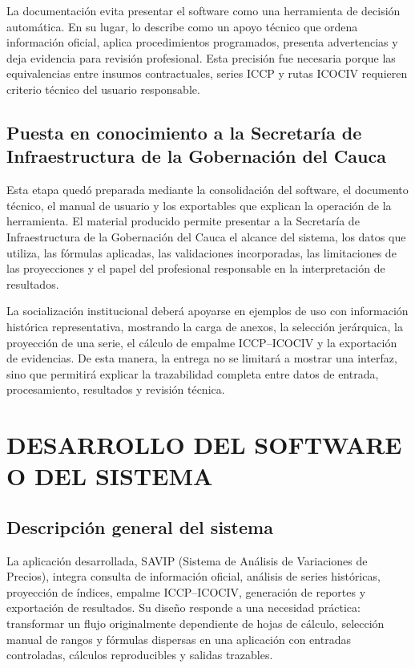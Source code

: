 \documentclass[12pt,letterpaper]{article}
\newcommand{\ICOCIV}{ICOCIV}
\newcommand{\ICCP}{ICCP}
\begin{document}
La documentación evita presentar el software como una herramienta de decisión automática. En su lugar, lo describe como un apoyo técnico que ordena información oficial, aplica procedimientos programados, presenta advertencias y deja evidencia para revisión profesional. Esta precisión fue necesaria porque las equivalencias entre insumos contractuales, series \ICCP{} y rutas \ICOCIV{} requieren criterio técnico del usuario responsable.

\subsection{Puesta en conocimiento a la Secretaría de Infraestructura de la Gobernación del Cauca}

Esta etapa quedó preparada mediante la consolidación del software, el documento técnico, el manual de usuario y los exportables que explican la operación de la herramienta. El material producido permite presentar a la Secretaría de Infraestructura de la Gobernación del Cauca el alcance del sistema, los datos que utiliza, las fórmulas aplicadas, las validaciones incorporadas, las limitaciones de las proyecciones y el papel del profesional responsable en la interpretación de resultados.

La socialización institucional deberá apoyarse en ejemplos de uso con información histórica representativa, mostrando la carga de anexos, la selección jerárquica, la proyección de una serie, el cálculo de empalme \ICCP--\ICOCIV{} y la exportación de evidencias. De esta manera, la entrega no se limitará a mostrar una interfaz, sino que permitirá explicar la trazabilidad completa entre datos de entrada, procesamiento, resultados y revisión técnica.

\section{DESARROLLO DEL SOFTWARE O DEL SISTEMA}

\subsection{Descripción general del sistema}

La aplicación desarrollada, SAVIP (Sistema de Análisis de Variaciones de Precios), integra consulta de información oficial, análisis de series históricas, proyección de índices, empalme \ICCP--\ICOCIV, generación de reportes y exportación de resultados. Su diseño responde a una necesidad práctica: transformar un flujo originalmente dependiente de hojas de cálculo, selección manual de rangos y fórmulas dispersas en una aplicación con entradas controladas, cálculos reproducibles y salidas trazables.
\end{document}
